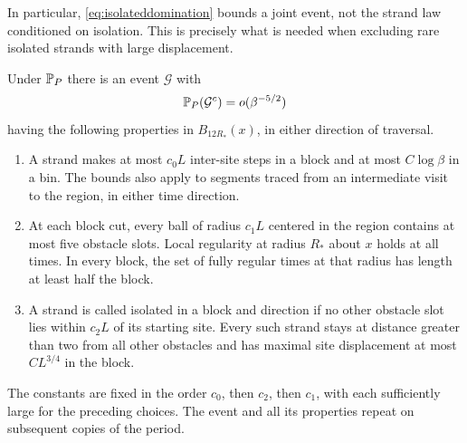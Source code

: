 

In particular, \eqref{eq:isolateddomination} bounds a joint event, not
the strand law conditioned on isolation.  This is precisely what is
needed when excluding rare isolated strands with large displacement.

\begin{proposition}\label{prop:good}
Under $\mathbb P_P$ there is an event $\mathcal G$ with
\begin{equation}\label{eq:goodprob}
 \mathbb P_P(\mathcal G^c)=o(\beta^{-5/2})
\end{equation}
having the following properties in $B_{12R_*}(x)$, in either direction
of traversal.
\begin{enumerate}
\item A strand makes at most $c_0L$ inter-site steps in a block and at
most $C\log\beta$ in a bin.  The bounds also apply to segments traced
from an intermediate visit to the region, in either time direction.
\item At each block cut, every ball of radius $c_1L$ centered in the
region contains at most five obstacle slots.  Local regularity at
radius $R_*$ about $x$ holds at all times.  In every block, the set of
fully regular times at that radius has length at least half the block.
\item A strand is called isolated in a block and direction if no other
obstacle slot lies within $c_2L$ of its starting site.  Every such
strand stays at distance greater than two from all other obstacles
and has maximal site displacement at most $CL^{3/4}$ in the block.
\end{enumerate}
The constants are fixed in the order $c_0$, then $c_2$, then $c_1$,
with each sufficiently large for the preceding choices.  The event
and all its properties repeat on subsequent copies of the period.
\end{proposition}

